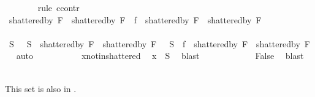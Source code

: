 \begin{isabellebody}
\ \ \ \ \ \ \isamarkupfalse%
\ {\isacharparenleft}{\kern0pt}rule\ ccontr{\isacharparenright}{\kern0pt}\isanewline
\ \ \ \ \ \ \ \ \isamarkupfalse%
\ {\isachardoublequoteopen}{\isacharparenleft}{\kern0pt}shattered{\isacharunderscore}{\kern0pt}by\ {\isacharquery}{\kern0pt}F{}\ {\isasymunion}\ shattered{\isacharunderscore}{\kern0pt}by\ {\isacharquery}{\kern0pt}F{}{\isacharparenright}{\kern0pt}\ {\isasyminter}\ {\isacharquery}{\kern0pt}f\ {\isacharbackquote}{\kern0pt}\ {\isacharparenleft}{\kern0pt}shattered{\isacharunderscore}{\kern0pt}by\ {\isacharquery}{\kern0pt}F{}\ {\isasyminter}\ shattered{\isacharunderscore}{\kern0pt}by\ {\isacharquery}{\kern0pt}F{}{\isacharparenright}{\kern0pt}\ {\isasymnoteq}\ {\isacharbraceleft}{\kern0pt}{\isacharbraceright}{\kern0pt}{\isachardoublequoteclose}\isanewline
\ \ \ \ \ \ \ \ \isamarkupfalse%
\ \isamarkupfalse%
\ S\ \ {}{}{\isacharcolon}{\kern0pt}\ {\isachardoublequoteopen}S\ {\isasymin}\ {\isacharparenleft}{\kern0pt}shattered{\isacharunderscore}{\kern0pt}by\ {\isacharquery}{\kern0pt}F{}\ {\isasymunion}\ shattered{\isacharunderscore}{\kern0pt}by\ {\isacharquery}{\kern0pt}F{}{\isacharparenright}{\kern0pt}{\isachardoublequoteclose}\ \ {}{}{\isacharcolon}{\kern0pt}\ {\isachardoublequoteopen}S\ {\isasymin}\ {\isacharquery}{\kern0pt}f\ {\isacharbackquote}{\kern0pt}\ {\isacharparenleft}{\kern0pt}shattered{\isacharunderscore}{\kern0pt}by\ {\isacharquery}{\kern0pt}F{}\ {\isasyminter}\ shattered{\isacharunderscore}{\kern0pt}by\ {\isacharquery}{\kern0pt}F{}{\isacharparenright}{\kern0pt}{\isachardoublequoteclose}\ \isamarkupfalse%
\ auto\isanewline
\ \ \ \ \ \ \ \ \isamarkupfalse%
\ {}{}\ x{\isacharunderscore}{\kern0pt}not{\isacharunderscore}{\kern0pt}in{\isacharunderscore}{\kern0pt}shattered\ \isamarkupfalse%
\ {\isachardoublequoteopen}x\ {\isasymnotin}\ S{\isachardoublequoteclose}\ \isamarkupfalse%
\ blast\isanewline
\ \ \ \ \ \ \ \ \isamarkupfalse%
\ {}{}\ \isamarkupfalse%
\ {\isachardoublequoteopen}False{\isachardoublequoteclose}\ \isamarkupfalse%
\ blast\isanewline
\ \ \ \ \ \ \isamarkupfalse%
%
\begin{isamarkuptext}%
This set is also in .%

\end{isamarkuptext}
\end{isabellebody}
